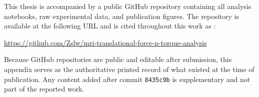 

This thesis is accompanied by a public GitHub repository containing all analysis
notebooks, raw experimental data, and publication figures. The repository is
available at the following URL and is cited throughout this work as
\cite{juarezluna2025mrisafety}:

\begin{center}
\url{https://github.com/Zslw/mri-translational-force-n-torque-analysis}
\end{center}


Because GitHub repositories are public and editable after submission, this
appendix serves as the authoritative printed record of what existed at the time
of publication. Any content added after commit \texttt{8435c9b} is supplementary
and not part of the reported work.

\vspace{1em}

\begin{table}[h]
\centering
\caption{Repository archive record at time of thesis submission.}
\label{tab:github_archive}
\end{table}

